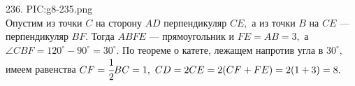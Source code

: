 236. {{PIC:g8-235.png}}\\
Опустим из точки $C$ на сторону $AD$ перпендикуляр $CE,$ а из точки $B$ на $CE$ --- перпендикуляр $BF.$ Тогда $ABFE$ --- прямоугольник и $FE=AB=3,$ а $\angle CBF=  120^\circ-90^\circ=30^\circ.$ По теореме о катете, лежащем напротив угла в $30^\circ,$ имеем равенства $CF=\cfrac{1}{2}BC=1,\ CD=2CE=2(CF+FE)=2(1+3)=8.$\\
